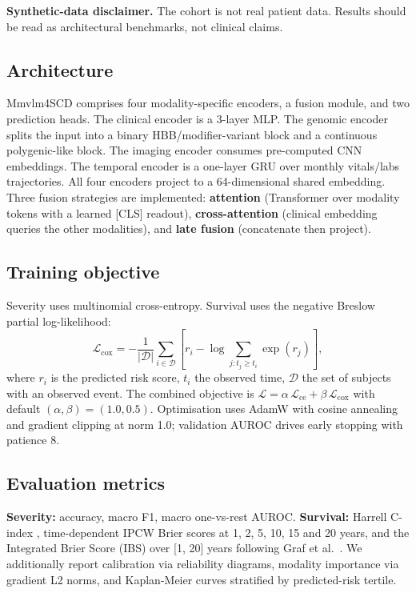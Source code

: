 \documentclass[11pt,a4paper]{article}
\begin{document}
\textbf{Synthetic-data disclaimer.} The cohort is not real patient data. Results should be read as architectural benchmarks, not clinical claims.
\subsection{Architecture}
Mmvlm4SCD comprises four modality-specific encoders, a fusion module, and two prediction heads. The clinical encoder is a 3-layer MLP. The genomic encoder splits the input into a binary HBB/modifier-variant block and a continuous polygenic-like block. The imaging encoder consumes pre-computed CNN embeddings. The temporal encoder is a one-layer GRU over monthly vitals/labs trajectories. All four encoders project to a 64-dimensional shared embedding. Three fusion strategies are implemented: \textbf{attention} (Transformer over modality tokens with a learned [CLS] readout), \textbf{cross-attention} (clinical embedding queries the other modalities), and \textbf{late fusion} (concatenate then project).
\subsection{Training objective}
Severity uses multinomial cross-entropy. Survival uses the negative Breslow partial log-likelihood:
\begin{equation}
\mathcal{L}_{\mathrm{cox}} = -\frac{1}{|\mathcal{D}|}\sum_{i\in\mathcal{D}}\!\left[r_i - \log\!\sum_{j: t_j\ge t_i}\exp(r_j)\right],
\end{equation}
where $r_i$ is the predicted risk score, $t_i$ the observed time, $\mathcal{D}$ the set of subjects with an observed event. The combined objective is $\mathcal{L}=\alpha\,\mathcal{L}_\mathrm{ce}+\beta\,\mathcal{L}_\mathrm{cox}$ with default $(\alpha,\beta)=(1.0,0.5)$. Optimisation uses AdamW with cosine annealing and gradient clipping at norm 1.0; validation AUROC drives early stopping with patience 8.
\subsection{Evaluation metrics}
\textbf{Severity:} accuracy, macro F1, macro one-vs-rest AUROC. \textbf{Survival:} Harrell C-index \cite{Harrell1996}, time-dependent IPCW Brier scores at 1, 2, 5, 10, 15 and 20 years, and the Integrated Brier Score (IBS) over [1, 20] years following Graf et al.~\cite{Graf1999}. We additionally report calibration via reliability diagrams, modality importance via gradient L2 norms, and Kaplan-Meier curves stratified by predicted-risk tertile.
\end{document}
